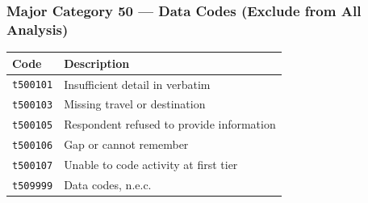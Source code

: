 \documentclass[11pt, a4paper]{article}
\begin{document}
\subsubsection*{Major Category 50 --- Data Codes (Exclude from All Analysis)}
\begin{longtable}{L{3cm} L{13cm}}
\toprule \textbf{Code} & \textbf{Description} \\ \midrule \endhead
\bottomrule \endfoot
\texttt{t500101} & Insufficient detail in verbatim \\
 \texttt{t500103} & Missing travel or destination \\
\texttt{t500105} & Respondent refused to provide information \\
 \texttt{t500106} & Gap or cannot remember \\
\texttt{t500107} & Unable to code activity at first tier \\
 \texttt{t509999} & Data codes, n.e.c. \\
\end{longtable}
\end{document}
